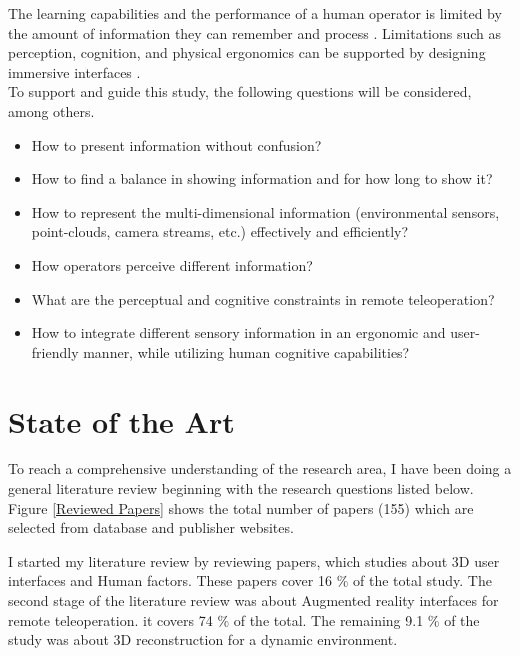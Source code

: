 The learning capabilities and the performance of a human operator is limited by the amount of information they can remember and process \cite{NAP25118}. Limitations such as perception, cognition, and physical ergonomics can be supported by designing immersive interfaces \cite{Bowman:2004:UIT:993837}.\\
To support and guide this study, the following questions will be considered, among others.
\begin{itemize}
    \item How to present information without confusion?
    \item How to find a balance in showing information and for how long to show it?
    \item How to represent the multi-dimensional information (environmental sensors, point-clouds, camera streams, etc.) effectively and efficiently?
    \item How operators perceive different information?
    \item What are the perceptual and cognitive constraints in remote teleoperation?
    \item How to integrate different sensory information in an ergonomic and user-friendly manner, while utilizing human cognitive capabilities?
\end{itemize} 

\section{State of the Art}



To reach a comprehensive understanding of the research area, I have been doing a general literature review beginning with the research questions listed below. Figure \ref{Reviewed Papers} shows the total number of papers (155) which are selected from database and publisher websites.

I started my literature review by reviewing papers, which studies about 3D user interfaces and Human factors. These papers cover 16 $\%$ of the total study. The second stage of the literature review was about Augmented reality interfaces for remote teleoperation. it covers  74 $\%$ of the total. The remaining 9.1 $\%$ of the study was about 3D reconstruction for a dynamic environment.

